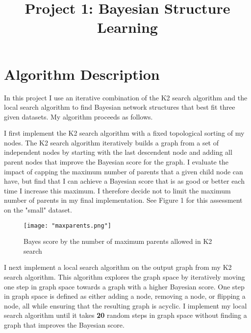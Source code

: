 \documentclass[twoside,11pt]{article}
\begin{document}
\title{Project 1: Bayesian Structure Learning}



\maketitle


\section{Algorithm Description}

In this project I use an iterative combination of the K2 search algorithm and the local search algorithm to find Bayesian network structures that best fit three given datasets. My algorithm proceeds as follows.

I first implement the K2 search algorithm with a fixed topological sorting of my nodes. The K2 search algorithm iteratively builds a graph from a set of independent nodes by starting with the last descendent node and adding all parent nodes that improve the Bayesian score for the graph. I evaluate the impact of capping the maximum number of parents that a given child node can have, but find that I can achieve a Bayesian score that is as good or better each time I increase this maximum.  I therefore decide not to limit the maximum number of parents in my final implementation. See Figure 1 for this assessment on the "small" dataset.

\begin{figure}[h]
    \centering
    \texttt{[image: "maxparents.png"]}
    \caption{Bayes score by the number of maximum parents allowed in K2 search}
    \label{fig:maxpar}
\end{figure}

I next implement a local search algorithm on the output graph from my K2 search algorithm. This algorithm explores the graph space by iteratively moving one step in graph space towards a graph with a higher Bayesian score. One step in graph space is defined as either adding a node, removing a node, or flipping a node, all while ensuring that the resulting graph is acyclic. I implement my local search algorithm until it takes \textbf{20} random steps in graph space without finding a graph that improves the Bayesian score.
\end{document}
